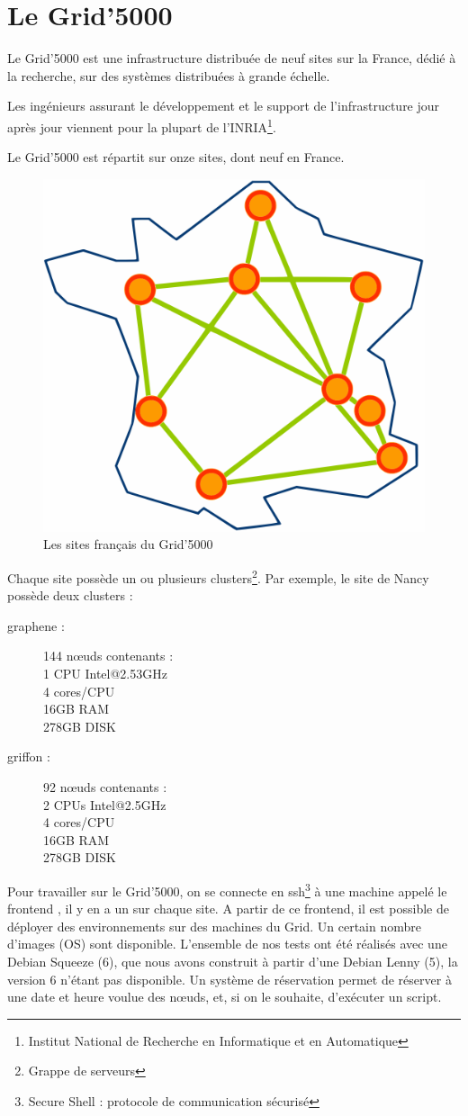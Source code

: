 \documentclass[12pt]{report}
\begin{document}
		\section{Le Grid'5000}
		Le Grid'5000 est une infrastructure distribuée de neuf sites sur la France, dédié à la recherche,
		sur des systèmes distribuées à grande échelle.

		Les ingénieurs assurant le développement et le support de l'infrastructure jour après jour viennent pour la plupart	de l'INRIA\footnote{Institut National de Recherche en Informatique et en Automatique}.

		Le Grid'5000 est répartit sur onze sites, dont neuf en France.

		\begin{figure}[H]
			\begin{center}
				\includegraphics[width=0.4\linewidth]{images/Site_map.png}
				\caption{Les sites français du Grid'5000}
			\end{center}
		\end{figure}

		Chaque site possède un ou plusieurs clusters\footnote{Grappe de serveurs}. Par exemple, le site de Nancy possède deux clusters :
		
		\begin{description}
			\item[graphene :] 144 nœuds contenants :\\
			1 CPU Intel@2.53GHz\\
			4 cores/CPU\\
			16GB RAM\\
			278GB DISK
			\item[griffon :] 92 nœuds contenants :\\
			2 CPUs Intel@2.5GHz\\
			4 cores/CPU\\
			16GB RAM\\
			278GB DISK
		\end{description}

		Pour travailler sur le Grid'5000, on se connecte en ssh\footnote{Secure Shell : protocole de communication sécurisé} à une machine appelé le \og frontend \fg, il y en a un sur chaque site.
		A partir de ce frontend, il est possible de déployer des environnements sur des machines du Grid.
		Un certain nombre d'images (OS) sont disponible. L'ensemble de nos tests ont été réalisés avec une Debian Squeeze (6),
		que nous avons construit à partir d'une Debian Lenny (5), la version 6 n'étant pas disponible.
		Un système de réservation permet de réserver à une date et heure voulue des nœuds, et, si on le souhaite,
		d'exécuter un script.
\end{document}
